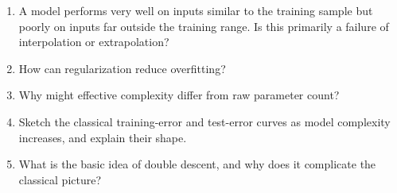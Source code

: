 \begin{enumerate}
    \item A model performs very well on inputs similar to the training sample but poorly on inputs far outside the training range. Is this primarily a failure of interpolation or extrapolation?

    \item How can regularization reduce overfitting?

    \item Why might effective complexity differ from raw parameter count?

    \item Sketch the classical training-error and test-error curves as model complexity increases, and explain their shape.

    \item What is the basic idea of double descent, and why does it complicate the classical picture?
\end{enumerate}